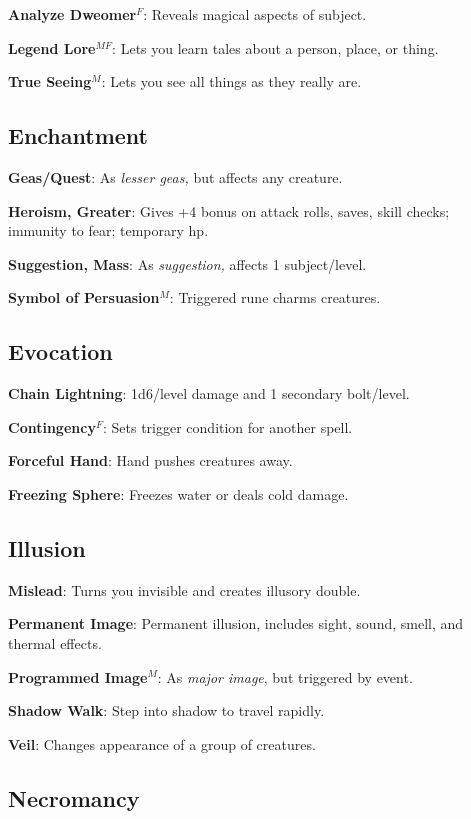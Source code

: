 \textbf{Analyze Dweomer}\(^{F}\): Reveals magical aspects of subject.

\textbf{Legend Lore}\(^{MF}\): Lets you learn tales about a person, place, or thing.

\textbf{True Seeing}\(^{M}\): Lets you see all things as they really are.

\subsection{Enchantment}


\textbf{Geas/Quest}: As \textit{lesser geas, }but affects any creature.

\textbf{Heroism, Greater}: Gives +4 bonus on attack rolls, saves, skill checks; immunity to fear; temporary hp.

\textbf{Suggestion, Mass}: As \textit{suggestion, }affects 1 subject/level.

\textbf{Symbol of Persuasion}\(^{M}\): Triggered rune charms creatures.

\subsection{Evocation}


\textbf{Chain Lightning}: 1d6/level damage and 1 secondary bolt/level.

\textbf{Contingency}\(^{F}\): Sets trigger condition for another spell.

\textbf{Forceful Hand}: Hand pushes creatures away.

\textbf{Freezing Sphere}: Freezes water or deals cold damage.

\subsection{Illusion}


\textbf{Mislead}: Turns you invisible and creates illusory double.

\textbf{Permanent Image}: Permanent illusion, includes sight, sound, smell, and thermal effects.

\textbf{Programmed Image}\(^{M}\): As \textit{major image}, but triggered by event.

\textbf{Shadow Walk}: Step into shadow to travel rapidly.

\textbf{Veil}: Changes appearance of a group of creatures.

\subsection{Necromancy}


